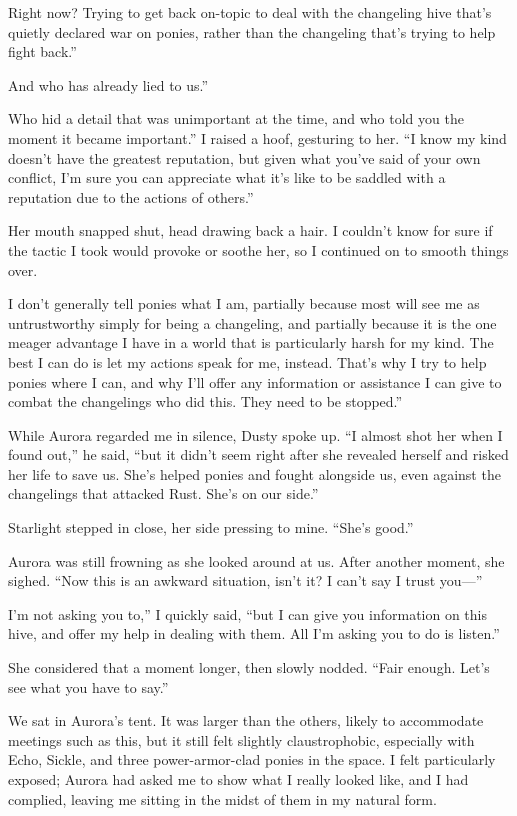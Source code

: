 \leavevmode{}Right now? Trying to get back on-topic to deal with the changeling hive that’s quietly declared war on ponies, rather than the changeling that’s trying to help fight back.”

\leavevmode{}And who has already lied to us.”

\leavevmode{}Who hid a detail that was unimportant at the time, and who told you the moment it became important.” I raised a hoof, gesturing to her. “I know my kind doesn’t have the greatest reputation, but given what you’ve said of your own conflict, I’m sure you can appreciate what it’s like to be saddled with a reputation due to the actions of others.”

Her mouth snapped shut, head drawing back a hair. I couldn’t know for sure if the tactic I took would provoke or soothe her, so I continued on to smooth things over.

\leavevmode{}I don’t generally tell ponies what I am, partially because most will see me as untrustworthy simply for being a changeling, and partially because it is the one meager advantage I have in a world that is particularly harsh for my kind. The best I can do is let my actions speak for me, instead. That’s why I try to help ponies where I can, and why I’ll offer any information or assistance I can give to combat the changelings who did this. They need to be stopped.”

While Aurora regarded me in silence, Dusty spoke up. “I almost shot her when I found out,” he said, “but it didn’t seem right after she revealed herself and risked her life to save us. She’s helped ponies and fought alongside us, even against the changelings that attacked Rust. She’s on our side.”

Starlight stepped in close, her side pressing to mine. “She’s good.”

Aurora was still frowning as she looked around at us. After another moment, she sighed. “Now this is an awkward situation, isn’t it? I can’t say I trust you—”

\leavevmode{}I’m not asking you to,” I quickly said, “but I can give you information on this hive, and offer my help in dealing with them. All I’m asking you to do is listen.”

She considered that a moment longer, then slowly nodded. “Fair enough. Let’s see what you have to say.”

{\br}%
We sat in Aurora’s tent. It was larger than the others, likely to accommodate meetings such as this, but it still felt slightly claustrophobic, especially with Echo, Sickle, and three power-armor-clad ponies in the space. I felt particularly exposed; Aurora had asked me to show what I really looked like, and I had complied, leaving me sitting in the midst of them in my natural form.

